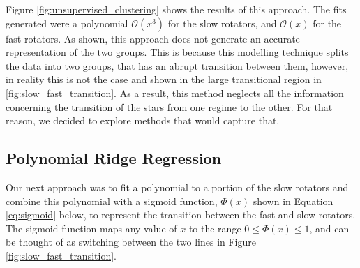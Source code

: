 \documentclass[fleqn,usenatbib]{mnras}
\begin{document}
Figure \ref{fig:unsupervised_clustering} shows the results of this approach.
The fits generated were a polynomial $\mathcal{O}(x^3)$ for the slow rotators, and $\mathcal{O}(x)$ for the fast rotators.
As shown, this approach does not generate an accurate representation of the two groups.
This is because this modelling technique splits the data into two groups, that has an abrupt transition between them, however, in reality this is not the case and shown in the large transitional region in \ref{fig:slow_fast_transition}.
As a result, this method neglects all the information concerning the transition of the stars from one regime to the other.
For that reason, we decided to explore methods that would capture that.

\subsection{Polynomial Ridge Regression}
Our next approach was to fit a polynomial to a portion of the slow rotators and combine this polynomial with a sigmoid function, $\Phi\left(x\right)$ shown in Equation \ref{eq:sigmoid} below, to represent the transition between the fast and slow rotators.
The sigmoid function maps any value of $x$ to the range $ 0 \leq \Phi\left(x\right) \leq 1$, and can be thought of as switching between the two lines in Figure \ref{fig:slow_fast_transition}.
\end{document}
